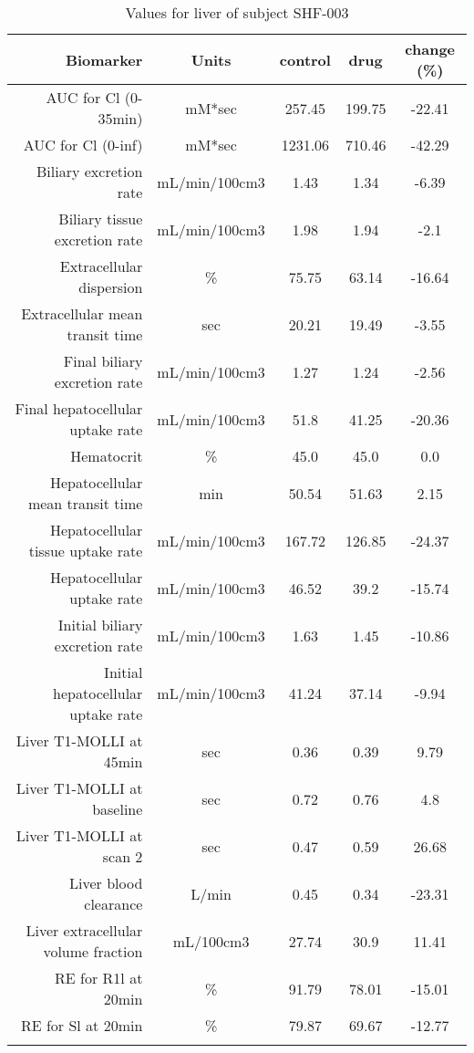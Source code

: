 \documentclass{epflreport}%
\begin{document}
%
\clearpage%
\begin{longtable}{rcccc}%
\hline%
Biomarker&Units&control&drug&change (\%)\\%
\hline%
AUC for Cl (0{-}35min)&mM*sec&257.45&199.75&{-}22.41\\%
AUC for Cl (0{-}inf)&mM*sec&1231.06&710.46&{-}42.29\\%
Biliary excretion rate&mL/min/100cm3&1.43&1.34&{-}6.39\\%
Biliary tissue excretion rate&mL/min/100cm3&1.98&1.94&{-}2.1\\%
Extracellular dispersion&\%&75.75&63.14&{-}16.64\\%
Extracellular mean transit time&sec&20.21&19.49&{-}3.55\\%
Final biliary excretion rate&mL/min/100cm3&1.27&1.24&{-}2.56\\%
Final hepatocellular uptake rate&mL/min/100cm3&51.8&41.25&{-}20.36\\%
Hematocrit&\%&45.0&45.0&0.0\\%
Hepatocellular mean transit time&min&50.54&51.63&2.15\\%
Hepatocellular tissue uptake rate&mL/min/100cm3&167.72&126.85&{-}24.37\\%
Hepatocellular uptake rate&mL/min/100cm3&46.52&39.2&{-}15.74\\%
Initial biliary excretion rate&mL/min/100cm3&1.63&1.45&{-}10.86\\%
Initial hepatocellular uptake rate&mL/min/100cm3&41.24&37.14&{-}9.94\\%
Liver T1{-}MOLLI at 45min&sec&0.36&0.39&9.79\\%
Liver T1{-}MOLLI at baseline&sec&0.72&0.76&4.8\\%
Liver T1{-}MOLLI at scan 2&sec&0.47&0.59&26.68\\%
Liver blood clearance&L/min&0.45&0.34&{-}23.31\\%
Liver extracellular volume fraction&mL/100cm3&27.74&30.9&11.41\\%
RE for R1l at 20min&\%&91.79&78.01&{-}15.01\\%
RE for Sl at 20min&\%&79.87&69.67&{-}12.77\\%
\hline%
\caption{Values for liver of subject SHF-003} \\%
\end{longtable}%
\end{document}

